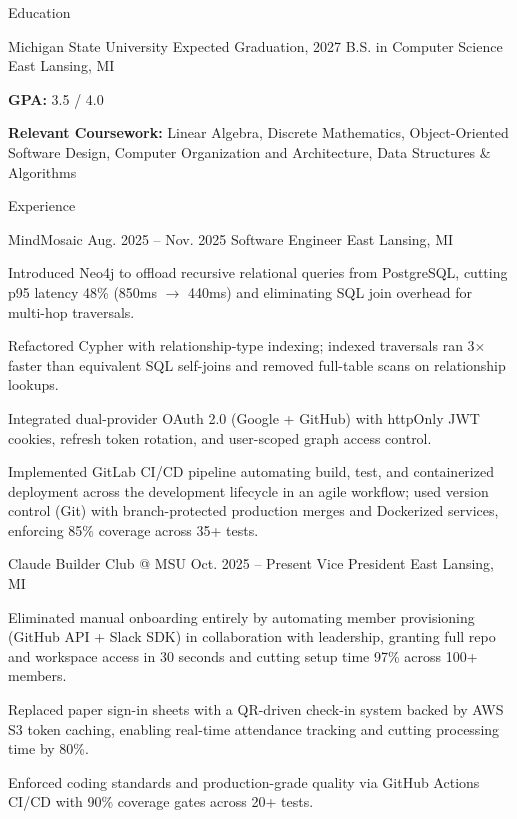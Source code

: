 \documentclass[
	11pt
]{../../../resume}
\begin{document}
	\begin{rSection}{E}{ducation}
		\begin{rSectionEntry}
			{Michigan State University}
			{Expected Graduation, 2027}
			{B.S. in Computer Science}
			{}
			{East Lansing, MI}

			\item \textbf{GPA:} 3.5 / 4.0
			\item \textbf{Relevant Coursework:} Linear Algebra, Discrete Mathematics, Object-Oriented Software Design, Computer Organization and Architecture, Data Structures \& Algorithms
		\end{rSectionEntry}
	\end{rSection}

	\begin{rSection}{E}{xperience}
		\begin{rSectionEntry}
			{MindMosaic}
			{Aug. 2025 -- Nov. 2025}
			{Software Engineer}
			{}
			{East Lansing, MI}

			\item Introduced Neo4j to offload recursive relational queries from PostgreSQL, cutting p95 latency 48\% (850ms $\rightarrow$ 440ms) and eliminating SQL join overhead for multi-hop traversals.
			\item Refactored Cypher with relationship-type indexing; indexed traversals ran 3$\times$ faster than equivalent SQL self-joins and removed full-table scans on relationship lookups.
			\item Integrated dual-provider OAuth 2.0 (Google + GitHub) with httpOnly JWT cookies, refresh token rotation, and user-scoped graph access control.
			\item Implemented GitLab CI/CD pipeline automating build, test, and containerized deployment across the development lifecycle in an agile workflow; used version control (Git) with branch-protected production merges and Dockerized services, enforcing 85\% coverage across 35+ tests.
		\end{rSectionEntry}

		\begin{rSectionEntry}
			{Claude Builder Club @ MSU}
			{Oct. 2025 -- Present}
			{Vice President}
			{}
			{East Lansing, MI}

			\item Eliminated manual onboarding entirely by automating member provisioning (GitHub API + Slack SDK) in collaboration with leadership, granting full repo and workspace access in 30 seconds and cutting setup time 97\% across 100+ members.
			\item Replaced paper sign-in sheets with a QR-driven check-in system backed by AWS S3 token caching, enabling real-time attendance tracking and cutting processing time by 80\%.
			\item Enforced coding standards and production-grade quality via GitHub Actions CI/CD with 90\% coverage gates across 20+ tests.
		\end{rSectionEntry}
	\end{rSection}
\end{document}
